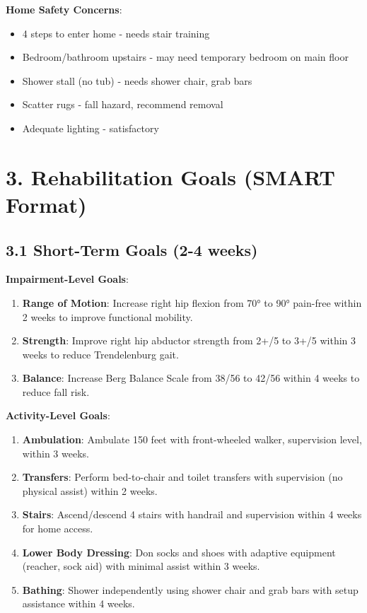 \documentclass[11pt,letterpaper]{article}
\begin{document}
\textbf{Home Safety Concerns}:
\begin{itemize}[leftmargin=*]
    \item 4 steps to enter home - needs stair training
    \item Bedroom/bathroom upstairs - may need temporary bedroom on main floor
    \item Shower stall (no tub) - needs shower chair, grab bars
    \item Scatter rugs - fall hazard, recommend removal
    \item Adequate lighting - satisfactory
\end{itemize}

\section*{3. Rehabilitation Goals (SMART Format)}

\subsection*{3.1 Short-Term Goals (2-4 weeks)}

\textbf{Impairment-Level Goals}:
\begin{enumerate}[leftmargin=*]
    \item \textbf{Range of Motion}: Increase right hip flexion from 70° to 90° pain-free within 2 weeks to improve functional mobility.

    \item \textbf{Strength}: Improve right hip abductor strength from 2+/5 to 3+/5 within 3 weeks to reduce Trendelenburg gait.

    \item \textbf{Balance}: Increase Berg Balance Scale from 38/56 to 42/56 within 4 weeks to reduce fall risk.
\end{enumerate}

\textbf{Activity-Level Goals}:
\begin{enumerate}[leftmargin=*]
    \item \textbf{Ambulation}: Ambulate 150 feet with front-wheeled walker, supervision level, within 3 weeks.

    \item \textbf{Transfers}: Perform bed-to-chair and toilet transfers with supervision (no physical assist) within 2 weeks.

    \item \textbf{Stairs}: Ascend/descend 4 stairs with handrail and supervision within 4 weeks for home access.

    \item \textbf{Lower Body Dressing}: Don socks and shoes with adaptive equipment (reacher, sock aid) with minimal assist within 3 weeks.

    \item \textbf{Bathing}: Shower independently using shower chair and grab bars with setup assistance within 4 weeks.
\end{enumerate}
\end{document}

